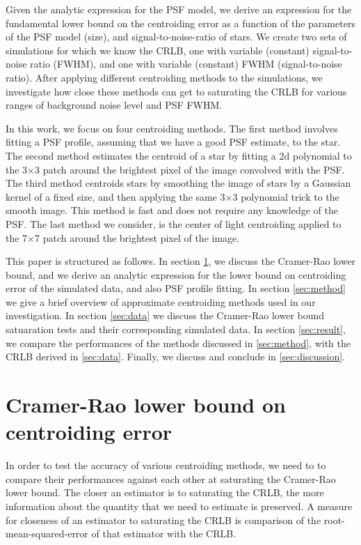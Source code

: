 \documentclass[12pt, preprint]{aastex}
\begin{document}
Given the analytic expression for the PSF model,
we derive an expression for the fundamental lower bound on the centroiding error as
a function of the parameters of the PSF model (\eg size),
and signal-to-noise-ratio of stars. We create two sets of simulations for which we 
know the CRLB, one with variable (constant) signal-to-noise ratio (FWHM), and one 
with variable (constant) FWHM (signal-to-noise ratio). After applying
different centroiding methods to the simulations,
we investigate how close these methods can get to saturating the CRLB for
various ranges of background noise level and PSF FWHM.

In this work, we focus on four centroiding methods. The first method
involves fitting a PSF profile, assuming that we have a good PSF estimate, to the star. 
The second method estimates the centroid of a star by fitting a 2d polynomial to
 the 3$\times$3 patch around the brightest pixel of the image convolved with the PSF. 
The third method centroids stars by
 smoothing the image of stars by a Gaussian kernel of a fixed size,
 and then applying the same 3$\times$3 polynomial trick to the smooth
 image. This method is fast and does not require any knowledge of the 
PSF. The last method we consider, is the center of light centroiding applied to the
 7$\times$7 patch around the brightest pixel of the image.

This paper is structured as follows. In section \ref{sec:CRLB},
we discuss the Cramer-Rao lower bound, and we derive
an analytic expression for the lower bound on centroiding error
of the simulated data, and also PSF profile fitting. 
In section \ref{sec:method} we give a brief overview of approximate 
centroiding methods used in our investigation.
In section \ref{sec:data} we discuss the Cramer-Rao lower bound satuaration
tests and their corresponding simulated data.
In section \ref{sec:result}, we compare the performances of the methods
discussed in \ref{sec:method}, with the CRLB derived in \ref{sec:data}. Finally,
 we discuss and conclude in \ref{sec:discussion}.               

\section{Cramer-Rao lower bound on centroiding error}\label{sec:CRLB}

In order to test the accuracy of various centroiding methods, we need to to compare their 
performances against each other at saturating the Cramer-Rao lower bound. The closer an estimator is to saturating 
the CRLB, the more information about the quantity that we 
need to estimate is preserved. A measure for closeness of an estimator to 
saturating the CRLB is comparison of the root-mean-squared-error of that estimator 
with the CRLB. 
\end{document}
